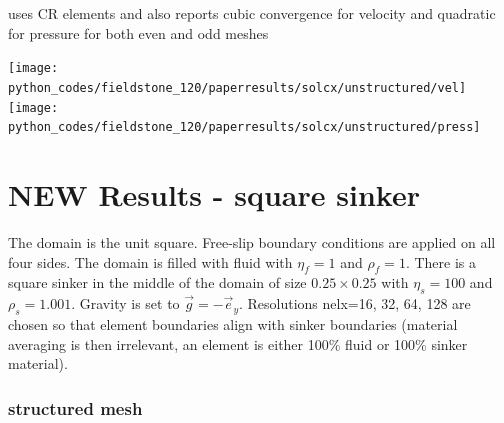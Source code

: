 \textcite{demh19} uses CR elements and also reports cubic convergence for velocity and quadratic for pressure
for both even and odd meshes

\texttt{[image: python\_codes/fieldstone\_120/paperresults/solcx/unstructured/vel]}
\texttt{[image: python\_codes/fieldstone\_120/paperresults/solcx/unstructured/press]}

\newpage
\section*{NEW Results - square sinker}

The domain is the unit square. Free-slip boundary conditions are applied on all 
four sides. The domain is filled with fluid with $\eta_f=1$ and $\rho_f=1$.
There is a square sinker in the middle of the domain of size $0.25\times 0.25$ with $\eta_s=100$ and
$\rho_s=1.001$. Gravity is set to $\vec{g}=-\vec{e}_y$. 
Resolutions nelx=16, 32, 64, 128 are chosen so that element boundaries align with sinker boundaries 
(material averaging is then irrelevant, an element is either 100\% fluid or 100\% sinker material). 


\subsubsection*{structured mesh}


